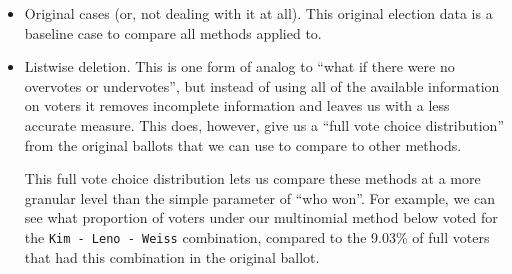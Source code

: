 \documentclass[12pt,twoside]{reedthesis}
\begin{document}
\begin{itemize}
\item
  Original cases (or, not dealing with it at all). This original election data is a baseline case to compare all methods applied to.
\item
  Listwise deletion. This is one form of analog to ``what if there were no overvotes or undervotes'', but instead of using all of the available information on voters it removes incomplete information and leaves us with a less accurate measure. This does, however, give us a ``full vote choice distribution'' from the original ballots that we can use to compare to other methods.
  \begin{table}[t]

    \caption[Listwise vote counts]{\label{tab:unnamed-chunk-20}Examination of full voter counts}
    \centering
    \end{table}
  This full vote choice distribution lets us compare these methods at a more granular level than the simple parameter of ``who won''. For example, we can see what proportion of voters under our multinomial method below voted for the \texttt{Kim\ -\ Leno\ -\ Weiss} combination, compared to the 9.03\% of full voters that had this combination in the original ballot.

\end{itemize}
\end{document}
